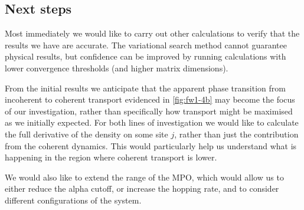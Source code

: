 \subsection{Next steps}
Most immediately we would like to carry out other calculations to verify that the results we have are accurate. The variational search method cannot guarantee physical results, but confidence can be improved by running calculations with lower convergence thresholds (and higher matrix dimensions).

From the initial results we anticipate that the apparent phase transition from incoherent to coherent transport evidenced in \cref{fig:fw1-4b} may become the focus of our investigation, rather than specifically how transport might be maximised as we initially expected. For both lines of investigation we would like to calculate the full derivative of the density on some site \(j\), rather than just the contribution from the coherent dynamics. This would particularly help us understand what is happening in the region where coherent transport is lower. 

We would also like to extend the range of the MPO, which would allow us to either reduce the alpha cutoff, or increase the hopping rate, and to consider different configurations of the system.